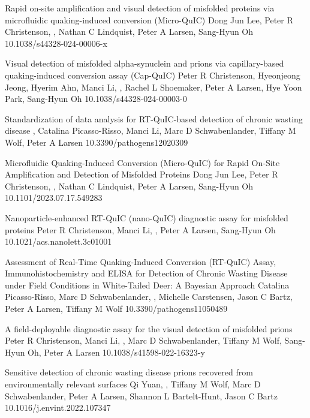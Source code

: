 \documentclass{resume}
\begin{document}
\begin{samepage}
            {Rapid on-site amplification and visual detection of misfolded proteins via microfluidic quaking-induced conversion (Micro-QuIC)}
            {Dong Jun Lee, Peter R Christenson, \me{}, Nathan C Lindquist, Peter A Larsen, Sang-Hyun Oh}
            {10.1038/s44328-024-00006-x}

            {Visual detection of misfolded alpha-synuclein and prions via capillary-based quaking-induced conversion assay (Cap-QuIC)}
            {Peter R Christenson, Hyeonjeong Jeong, Hyerim Ahn, Manci Li, \me{}, Rachel L Shoemaker, Peter A Larsen, Hye Yoon Park, Sang-Hyun Oh}
            {10.1038/s44328-024-00003-0}

            {Standardization of data analysis for RT-QuIC-based detection of chronic wasting disease}
            {\me{}, Catalina Picasso-Risso, Manci Li, Marc D Schwabenlander, Tiffany M Wolf, Peter A Larsen}
            {10.3390/pathogens12020309}

            {Microfluidic Quaking-Induced Conversion (Micro-QuIC) for Rapid On-Site Amplification and Detection of Misfolded Proteins}
            {Dong Jun Lee, Peter R Christenson, \me{}, Nathan C Lindquist, Peter A Larsen, Sang-Hyun Oh}
            {10.1101/2023.07.17.549283}

            {Nanoparticle-enhanced RT-QuIC (nano-QuIC) diagnostic assay for misfolded proteins}
            {Peter R Christenson, Manci Li, \me{}, Peter A Larsen, Sang-Hyun Oh}
            {10.1021/acs.nanolett.3c01001}

            {Assessment of Real-Time Quaking-Induced Conversion (RT-QuIC) Assay, Immunohistochemistry and ELISA for Detection of Chronic Wasting Disease under Field Conditions in White-Tailed Deer: A Bayesian Approach}
            {Catalina Picasso-Risso, Marc D Schwabenlander, \me{}, Michelle Carstensen, Jason C Bartz, Peter A Larsen, Tiffany M Wolf}
            {10.3390/pathogens11050489}

            {A field-deployable diagnostic assay for the visual detection of misfolded prions}
            {Peter R Christenson, Manci Li, \me{}, Marc D Schwabenlander, Tiffany M Wolf, Sang-Hyun Oh, Peter A Larsen}
            {10.1038/s41598-022-16323-y}

            {Sensitive detection of chronic wasting disease prions recovered from environmentally relevant surfaces}
            {Qi Yuan, \me{}, Tiffany M Wolf, Marc D Schwabenlander, Peter A Larsen, Shannon L Bartelt-Hunt, Jason C Bartz}
            {10.1016/j.envint.2022.107347}


\end{samepage}
\end{document}

